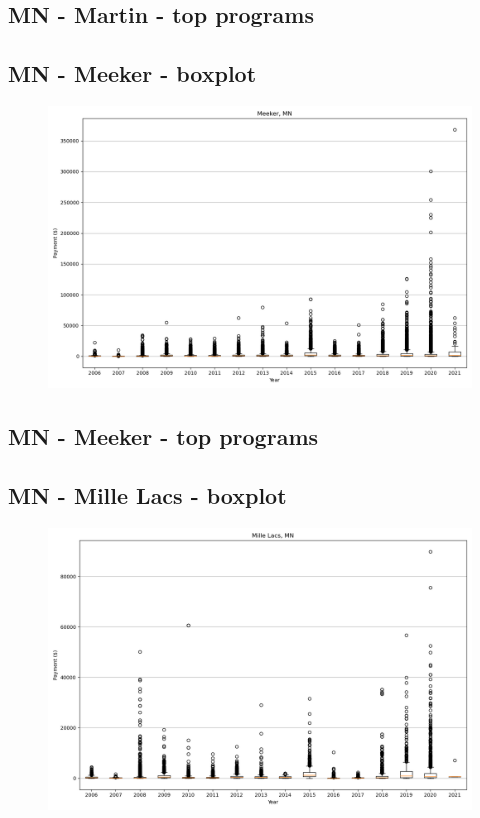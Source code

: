 \subsection*{MN - Martin - top programs}

\newpage
\subsection*{MN - Meeker - boxplot}
\begin{figure}[h]
\centering
\includegraphics[width=7in]{../output/boxplots/counties/Meeker-MN_boxplot.png}
\end{figure}


\subsection*{MN - Meeker - top programs}

\newpage
\subsection*{MN - Mille Lacs - boxplot}
\begin{figure}[h]
\centering
\includegraphics[width=7in]{../output/boxplots/counties/Mille Lacs-MN_boxplot.png}
\end{figure}



